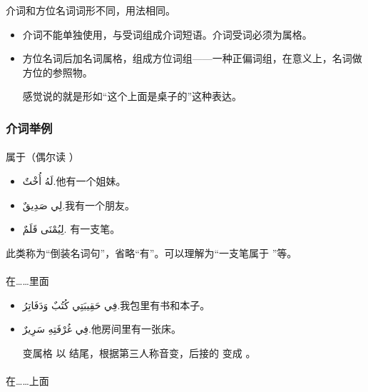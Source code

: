 介词和方位名词词形不同，用法相同。

\begin{itemize}
    \item 介词不能单独使用，与受词组成介词短语。介词受词必须为属格。
    \item 方位名词后加名词属格，组成方位词组——一种正偏词组，在意义上，名词做方位的参照物。
    \begin{note}
    感觉说的就是形如``这个上面是桌子的''这种表达。
    \end{note}
\end{itemize}

\subsubsection{介词举例}

\paragraph{} 属于（偶尔读  ）

\begin{itemize}
    \item \ac{لَهُ أُخْتٌ.}{他有一个姐妹。}
    \item \ac{لِي صَدِيقٌ.}{我有一个朋友。}
    \item \ac{لِيُمْنَى قَلَمٌ.}{  有一支笔。}
\end{itemize}
\begin{attention}
    此类称为``倒装名词句''，省略``有''。可以理解为``一支笔属于  ''等。
\end{attention}

\paragraph{} 在……里面

\begin{itemize}
    \item \ac{فِي حَقِيبَتِي كُتُبٌ وَدَفَاتِرُ.}{我包里有书和本子。}
    \item \ac{فِي غُرْفَتِهِ سَرِيرٌ.}{他房间里有一张床。}
    \begin{attention}
         变属格  以  结尾，根据第三人称音变，后接的  变成 。
    \end{attention}
\end{itemize}

\paragraph{} 在……上面
    

